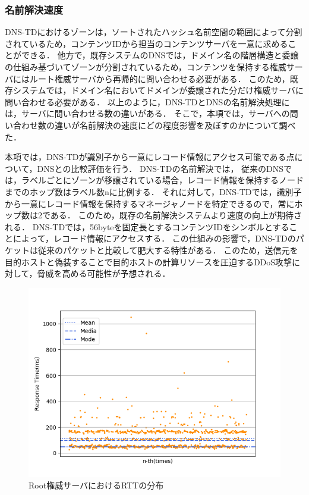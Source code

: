 \subsubsection{名前解決速度}
\label{sec:resolution_speed}
DNS-TDにおけるゾーンは，ソートされたハッシュ名前空間の範囲によって分割されているため，コンテンツIDから担当のコンテンツサーバを一意に求めることができる．
他方で，既存システムのDNSでは，ドメイン名の階層構造と委譲の仕組み基づいてゾーンが分割されているため，コンテンツを保持する権威サーバにはルート権威サーバから再帰的に問い合わせる必要がある．
このため，既存システムでは，ドメイン名においてドメインが委譲された分だけ権威サーバに問い合わせる必要がある．
以上のように，DNS-TDとDNSの名前解決処理には，サーバに問い合わせる数の違いがある．
そこで，本項では，サーバへの問い合わせ数の違いが名前解決の速度にどの程度影響を及ぼすのかについて調べた．

本項では，DNS-TDが識別子から一意にレコード情報にアクセス可能である点について，DNSとの比較評価を行う．
DNS-TDの名前解決では，
従来のDNSでは，ラベルごとにゾーンが移譲されている場合，レコード情報を保持するノードまでのホップ数はラベル数nに比例する．
それに対して，DNS-TDでは，識別子から一意にレコード情報を保持するマネージャノードを特定できるので，常にホップ数は2である．
このため，既存の名前解決システムより速度の向上が期待される．
DNS-TDでは，56byteを固定長とするコンテンツIDをシンボルとすることによって，レコード情報にアクセスする．
この仕組みの影響で，DNS-TDのパケットは従来のパケットと比較して肥大する特性がある．
このため，送信元を目的ホストと偽装することで目的ホストの計算リソースを圧迫するDDoS攻撃に対して，脅威を高める可能性が予想される．

\begin{figure}[h]
 \centering
 \includegraphics[scale=0.8]{figure/root-rtt.png}
 \caption{Root権威サーバにおけるRTTの分布}
 \label{fig:root-rtt}
\end{figure}

